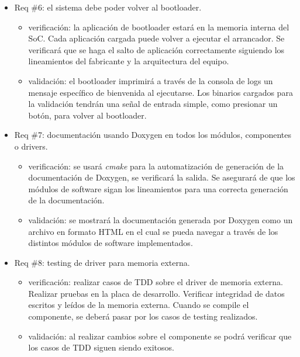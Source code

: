 \documentclass[
11pt, %
]{charter}
\begin{document}
\begin{itemize} 
\item Req \#6: el sistema debe poder volver al bootloader.

\begin{itemize}
	\item verificación: la aplicación de bootloader estará en la memoria interna del SoC. Cada aplicación cargada puede volver a ejecutar el arrancador. Se verificará que se haga el salto de aplicación correctamente siguiendo los lineamientos del fabricante y la arquitectura del equipo.
	\item validación: el bootloader imprimirá a través de la consola de logs un mensaje específico de bienvenida al ejecutarse. Los binarios cargados para la validación tendrán una señal de entrada simple, como presionar un botón, para volver al bootloader.
\end{itemize}

\end{itemize}

\begin{itemize} 
\item Req \#7: documentación usando Doxygen en todos los módulos, componentes o drivers.

\begin{itemize}
	\item verificación: se usará \textit{cmake} para la automatización de generación de la documentación de Doxygen, se verificará la salida. Se asegurará de que los módulos de software sigan los lineamientos para una correcta generación de la documentación.
	\item validación: se mostrará la documentación generada por Doxygen como un archivo en formato HTML en el cual se pueda navegar a través de los distintos módulos de software implementados. 
\end{itemize}

\end{itemize}

\begin{itemize} 
\item Req \#8: testing de driver para memoria externa.

\begin{itemize}
	\item verificación: realizar casos de TDD sobre el driver de memoria externa. Realizar pruebas en la placa de desarrollo. Verificar integridad de datos escritos y leídos de la memoria externa. Cuando se compile el componente, se deberá pasar por los casos de testing realizados.
	\item validación: al realizar cambios sobre el componente se podrá verificar que los casos de TDD siguen siendo exitosos.
\end{itemize}

\end{itemize}
\end{document}
